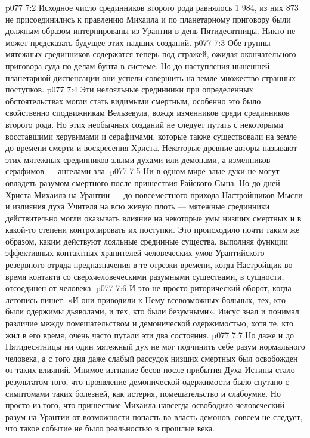 \vs p077 7:2 Исходное число срединников второго рода равнялось 1 984, из них 873 не присоединились к правлению Михаила и по планетарному приговору были должным образом интернированы из Урантии в день Пятидесятницы. Никто не может предсказать будущее этих падших созданий.
\vs p077 7:3 Обе группы мятежных срединников содержатся теперь под стражей, ожидая окончательного приговора суда по делам бунта в системе. Но до наступления нынешней планетарной диспенсации они успели совершить на земле множество странных поступков.
\vs p077 7:4 Эти нелояльные срединники при определенных обстоятельствах могли стать видимыми смертным, особенно это было свойственно сподвижникам Вельзевула, вождя изменников среди срединников второго рода. Но этих необычных созданий не следует путать с некоторыми восставшими херувимами и серафимами, которые также существовали на земле до времени смерти и воскресения Христа. Некоторые древние авторы называют этих мятежных срединников злыми духами или демонами, а изменников\hyp{}серафимов --- ангелами зла.
\vs p077 7:5 Ни в одном мире злые духи не могут овладеть разумом смертного после пришествия Райского Сына. Но до дней Христа\hyp{}Михаила на Урантии --- до повсеместного прихода Настройщиков Мысли и излияния духа Учителя на всю живую плоть --- мятежные срединники действительно могли оказывать влияние на некоторые умы низших смертных и в какой\hyp{}то степени контролировать их поступки. Это происходило почти таким же образом, каким действуют лояльные срединные существа, выполняя функции эффективных контактных хранителей человеческих умов Урантийского резервного отряда предназначения в те отрезки времени, когда Настройщик во время контакта со сверхчеловеческими разумными существами, в сущности, отсоединен от человека.
\vs p077 7:6 И это не просто риторический оборот, когда летопись пишет: «И они приводили к Нему всевозможных больных, тех, кто были одержимы дьяволами, и тех, кто были безумными». Иисус знал и понимал различие между помешательством и демонической одержимостью, хотя те, кто жил в его время, очень часто путали эти два состояния.
\vs p077 7:7 Но даже и до Пятидесятницы ни один мятежный дух не мог подчинить себе разум нормального человека, а с того дня даже слабый рассудок низших смертных был освобожден от таких влияний. Мнимое изгнание бесов после прибытия Духа Истины стало результатом того, что проявление демонической одержимости было спутано с симптомами таких болезней, как истерия, помешательство и слабоумие. Но просто из того, что пришествие Михаила навсегда освободило человеческий разум на Урантии от возможности попасть во власть демонов, совсем не следует, что такое событие не было реальностью в прошлые века.
